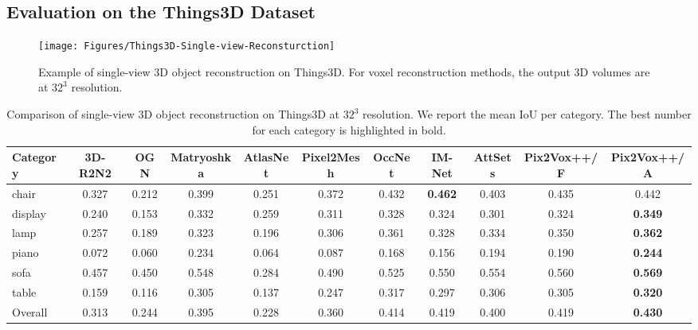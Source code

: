 \documentclass[twocolumn]{svjour3}
\begin{document}
\subsection{Evaluation on the Things3D Dataset}

\begin{figure*}
  \centering
  \resizebox{\linewidth}{!} {
    \texttt{[image: Figures/Things3D-Single-view-Reconsturction]}
  }
  \caption{Example of single-view 3D object reconstruction on Things3D. For voxel reconstruction methods, the output 3D volumes are at $32^3$ resolution.}
  \label{fig:things3d-single-view-reconstruction}
\end{figure*}

\begin{table*}[!t]
  \caption{Comparison of single-view 3D object reconstruction on Things3D at $32^3$ resolution. We report the mean IoU per category. The best number for each category is highlighted in bold.}
  \resizebox{\linewidth}{!} {
    \begin{tabular}{lcccccccccc}
      \toprule
      Category     & 3D-R2N2     & OGN        & Matryoshka
                   & AtlasNet    & Pixel2Mesh & OccNet
                   & IM-Net      & AttSets    
                   & Pix2Vox++/F & Pix2Vox++/A \\
      \midrule
      chair        & 0.327       & 0.212      & 0.399
                   & 0.251       & 0.372      & 0.432
                   & \bf{0.462}  & 0.403
                   & 0.435       & 0.442 \\
      display      & 0.240       & 0.153      & 0.332
                   & 0.259       & 0.311      & 0.328
                   & 0.324       & 0.301
                   & 0.324       & \bf{0.349} \\
      lamp         & 0.257       & 0.189      & 0.323
                   & 0.196       & 0.306      & 0.361
                   & 0.328       & 0.334
                   & 0.350       & \bf{0.362} \\
      piano        & 0.072       & 0.060      & 0.234
                   & 0.064       & 0.087      & 0.168
                   & 0.156       & 0.194
                   & 0.190       & \bf{0.244} \\
      sofa         & 0.457       & 0.450      & 0.548
                   & 0.284       & 0.490      & 0.525
                   & 0.550       & 0.554
                   & 0.560       & \bf{0.569} \\
      table        & 0.159       & 0.116      & 0.305
                   & 0.137       & 0.247      & 0.317
                   & 0.297       & 0.306
                   & 0.305       & \bf{0.320} \\
      \midrule
      Overall      & 0.313       & 0.244      & 0.395
                   & 0.228       & 0.360      & 0.414
                   & 0.419       & 0.400
                   & 0.419       & \bf{0.430} \\
      \bottomrule
    \end{tabular}
  }
  \label{tab:things3d-voxel-reconstruction-iou}
\end{table*}
\end{document}
